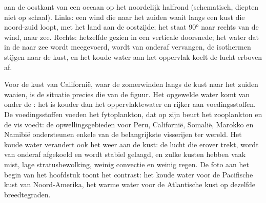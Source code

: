 \begin{omfigure}

{\small {} aan de oostkant van een oceaan op het noordelijk halfrond (schematisch, diepten niet op schaal). Links: een wind die naar het zuiden waait langs een kust die noord-zuid loopt, met het land aan de oostzijde; het  staat \ang{90} naar rechts van de wind, naar zee. Rechts: hetzelfde gezien in een verticale doorsnede; het water dat in de  naar zee wordt meegevoerd, wordt van onderaf vervangen, de isothermen stijgen naar de kust, en het koude water aan het oppervlak koelt de lucht erboven af.}
\label{fig:b1:ocean-circulation:upwelling}
\end{omfigure}

Voor de kust van Californië, waar de zomerwinden langs de kust naar het zuiden waaien, is de situatie precies die van de figuur. Het opgewelde water komt van onder de : het is kouder dan het oppervlaktewater en rijker aan voedingsstoffen. De voedingsstoffen voeden het fytoplankton, dat op zijn beurt het zooplankton en de vis voedt: de opwellingsgebieden voor Peru, Californië, Somalië, Marokko en Namibië ondersteunen enkele van de belangrijkste visserijen ter wereld. Het koude water verandert ook het weer aan de kust: de lucht die erover trekt, wordt van onderaf afgekoeld en wordt stabiel gelaagd, en zulke kusten hebben vaak mist, lage stratusbewolking, weinig convectie en weinig regen. De foto aan het begin van het hoofdstuk toont het contrast: het koude water voor de Pacifische kust van Noord-Amerika, het warme water voor de Atlantische kust op dezelfde breedtegraden.

